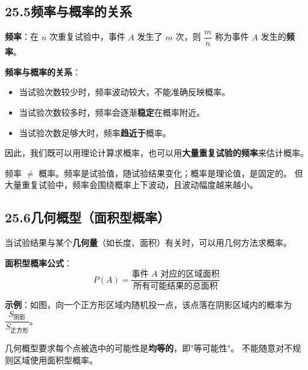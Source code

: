 \documentclass[12pt, a4paper]{ctexart}
\begin{document}
\subsection*{25.5\quad 频率与概率的关系}

\begin{knowledgebox}[7. 频率与概率]
\textbf{频率}：在 $n$ 次重复试验中，事件 $A$ 发生了 $m$ 次，则 $\dfrac{m}{n}$ 称为事件 $A$ 发生的\textbf{频率}。

\medskip
\textbf{频率与概率的关系}：
\begin{itemize}[leftmargin=2em]
  \item 当试验次数较少时，频率波动较大，不能准确反映概率。
  \item 当试验次数较多时，频率会逐渐\textbf{稳定}在概率附近。
  \item 当试验次数足够大时，频率\textbf{趋近于}概率。
\end{itemize}

\medskip
因此，我们既可以用理论计算求概率，也可以用\textbf{大量重复试验的频率}来估计概率。
\end{knowledgebox}

\begin{tipbox}[规律总结]
频率 $\neq$ 概率。频率是试验值，随试验结果变化；概率是理论值，是固定的。
但大量重复试验中，频率会围绕概率上下波动，且波动幅度越来越小。
\end{tipbox}

\subsection*{25.6\quad 几何概型（面积型概率）}

\begin{knowledgebox}[8. 几何概型]
当试验结果与某个\textbf{几何量}（如长度、面积）有关时，可以用几何方法求概率。

\medskip
\textbf{面积型概率公式}：
\[
  P(A) = \frac{\text{事件 } A \text{ 对应的区域面积}}{\text{所有可能结果的总面积}}
\]

\medskip
\textbf{示例}：如图，向一个正方形区域内随机投一点，该点落在阴影区域内的概率为 $\dfrac{S_{\text{阴影}}}{S_{\text{正方形}}}$。
\end{knowledgebox}

\begin{warnbox}[易错提醒]
几何概型要求每个点被选中的可能性是\textbf{均等的}，即"等可能性"。
不能随意对不规则区域使用面积型概率。
\end{warnbox}

\newpage
\end{document}
